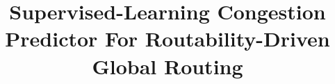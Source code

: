 \documentclass[conference]{IEEEtran}
\begin{document}
\title{Supervised-Learning Congestion Predictor For Routability-Driven Global Routing\\
}


\maketitle
\end{document}
